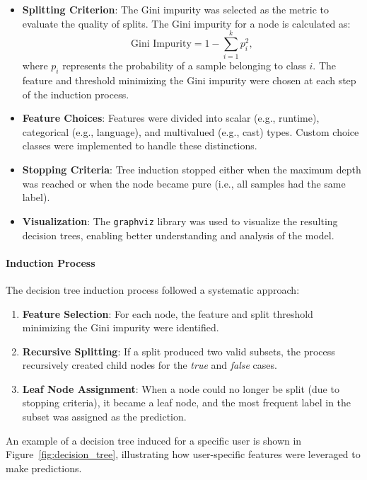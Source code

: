 \documentclass[a4paper,9pt]{article}
\begin{document}
\begin{itemize}

	\item \textbf{Splitting Criterion}:
	      The Gini impurity was selected as the metric to evaluate the quality of splits. The Gini impurity for a node is calculated as:
	      \begin{equation}
		      \text{Gini Impurity} = 1 - \sum_{i=1}^{k} p_i^2,
	      \end{equation}
	      where \(p_i\) represents the probability of a sample belonging to class \(i\). The feature and threshold minimizing the Gini impurity were chosen at each step of the induction process.
	\item \textbf{Feature Choices}: Features were divided into scalar (e.g., runtime), categorical (e.g., language), and multivalued (e.g., cast) types. Custom choice classes were implemented to handle these distinctions.
	\item \textbf{Stopping Criteria}: Tree induction stopped either when the maximum depth was reached or when the node became pure (i.e., all samples had the same label).
	\item \textbf{Visualization}: The \texttt{graphviz} library was used to visualize the resulting decision trees, enabling better understanding and analysis of the model.
\end{itemize}

\paragraph{Induction Process}
The decision tree induction process followed a systematic approach:
\begin{enumerate}
	\item \textbf{Feature Selection}:
	      For each node, the feature and split threshold minimizing the Gini impurity were identified.

	\item \textbf{Recursive Splitting}:
	      If a split produced two valid subsets, the process recursively created child nodes for the \textit{true} and \textit{false} cases.

	\item \textbf{Leaf Node Assignment}:
	      When a node could no longer be split (due to stopping criteria), it became a leaf node, and the most frequent label in the subset was assigned as the prediction.
\end{enumerate}

An example of a decision tree induced for a specific user is shown in Figure~\ref{fig:decision_tree}, illustrating how user-specific features were leveraged to make predictions.
\end{document}
